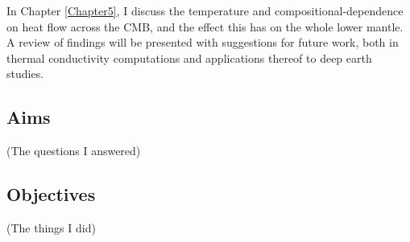 In Chapter \ref{Chapter5}, I discuss the temperature and compositional-dependence on heat flow across the CMB, and the effect this has on the whole lower mantle. A review of findings will be presented with suggestions for future work, both in thermal conductivity computations and applications thereof to deep earth studies.



\subsection{Aims}

(The questions I answered)

\subsection{Objectives}

(The things I did)
